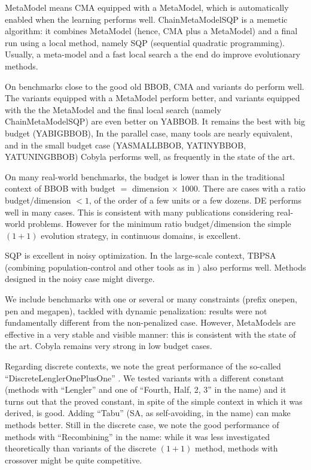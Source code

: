 MetaModel means CMA equipped with a MetaModel, which is automatically enabled when the learning performs well.
ChainMetaModelSQP is a memetic algorithm: it combines MetaModel (hence, CMA plus a MetaModel) and a final run using a local method, namely SQP (sequential quadratic programming).
Usually, a meta-model and a fast local search a the end do improve evolutionary methods.

On benchmarks close to the good old BBOB, CMA and variants do perform well. The variants equipped with a MetaModel perform better, and
variants equipped with the the MetaModel and the final local search (namely ChainMetaModelSQP) are even better on YABBOB. It
remains the best with big budget (YABIGBBOB), In the parallel case, many tools are nearly equivalent, and in the small
budget case (YASMALLBBOB, YATINYBBOB, YATUNINGBBOB) Cobyla performs well, as frequently in the state of the art.%

On many real-world benchmarks, the budget is lower than in the traditional context of BBOB with budget $=$ dimension $\times$ 1000. There
are cases with a ratio budget/dimension $<1$, of the order of a few units or a few dozens. DE performs well in many
cases. This is consistent with many publications considering real-world problems. %
However for the minimum ratio budget/dimension the simple $(1+1)$ evolution strategy, in continuous domains, is
excellent.


SQP is excellent in noisy optimization. In the large-scale context, TBPSA (combining population-control\cite{mlis} and other tools as in \cite{vasilfoga}) also performs well.
Methods designed in the noisy case might diverge.

We include benchmarks with one or several or many constraints (prefix onepen, pen and megapen), tackled with dynamic
penalization: results were not fundamentally different from the non-penalized case. However, MetaModels are effective in
a very stable and visible manner: this is consistent with the state of the art.%
Cobyla remains very strong in low budget cases.


Regarding discrete contexts, we note the great performance of the so-called ``DiscreteLenglerOnePlusOne''
\cite{lengler}. We tested variants with a different constant (methods with ``Lengler'' and one of ``Fourth, Half, 2, 3''
in the name) and it turns out that the proved constant, in spite of the simple context in which it was derived, is good.
Adding ``Tabu'' (SA, as self-avoiding, in the name) can make methods better.
Still in the discrete case, we note the good performance of methods with ``Recombining'' in the name: while it was less
investigated theoretically than variants of the discrete $(1+1)$ method, methods with crossover might be quite
competitive.

